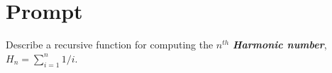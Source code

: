 \documentclass[11pt]{article}
\begin{document}
    \section{Prompt}\label{sec:prompt}

    Describe a recursive function for computing the $n^{th}$ \textbf{\textit{Harmonic number}},
$H_n = \sum_{i=1}^n 1/i$.
\end{document}
